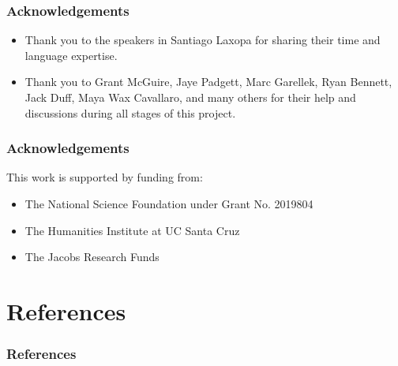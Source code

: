 \documentclass{beamer}
\begin{document}
\begin{frame}
  \frametitle{Acknowledgements}

  \begin{itemize}
    \item Thank you to the speakers in Santiago Laxopa for sharing their time and language expertise. 
    \item Thank you to Grant McGuire, Jaye Padgett, Marc Garellek, Ryan Bennett, Jack Duff, Maya Wax Cavallaro, and many others for their help and discussions during all stages of this project. 
  \end{itemize}
\end{frame}

\begin{frame}
  \frametitle{Acknowledgements}
  This work is supported by funding from: 
  \begin{itemize}
    \item The National Science Foundation under Grant No. 2019804
    \item The Humanities Institute at UC Santa Cruz 
    \item The Jacobs Research Funds
  \end{itemize}

\end{frame}

\appendix
\section{References}
\begin{frame}[t,allowframebreaks]
  \frametitle{References}
    \printbibliography
\end{frame}

\end{document}
